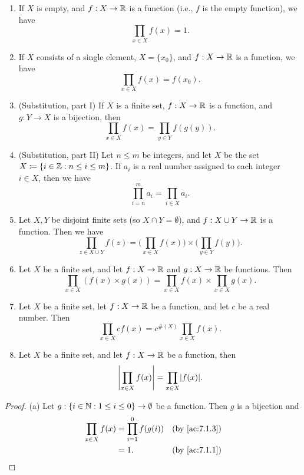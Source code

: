 \begin{ac}\label{ac:7.1.5}
  \mbox{}
  \begin{enumerate}
    \item If \(X\) is empty, and \(f : X \to \mathbb{R}\) is a function (i.e., \(f\) is the empty function), we have
          \[
            \prod_{x \in X} f(x) = 1.
          \]
    \item If \(X\) consists of a single element, \(X = \{x_0\}\), and \(f : X \to \mathbb{R}\) is a function, we have
          \[
            \prod_{x \in X} f(x) = f(x_0).
          \]
    \item (Substitution, part I) If \(X\) is a finite set, \(f : X \to \mathbb{R}\) is a function, and \(g : Y \to X\) is a bijection, then
          \[
            \prod_{x \in X} f(x) = \prod_{y \in Y} f(g(y)).
          \]
    \item (Substitution, part II) Let \(n \leq m\) be integers, and let \(X\) be the set \(X \coloneqq \{i \in \mathbb{Z} : n \leq i \leq m\}\).
          If \(a_i\) is a real number assigned to each integer \(i \in X\), then we have
          \[
            \prod_{i = n}^m a_i = \prod_{i \in X} a_i.
          \]
    \item Let \(X, Y\) be disjoint finite sets (so \(X \cap Y = \emptyset\)), and \(f : X \cup Y \to \mathbb{R}\) is a function.
          Then we have
          \[
            \prod_{z \in X \cup Y} f(z) = \Bigg(\prod_{x \in X} f(x)\Bigg) \times \Bigg(\prod_{y \in Y} f(y)\Bigg).
          \]
    \item Let \(X\) be a finite set, and let \(f : X \to \mathbb{R}\) and \(g : X \to \mathbb{R}\) be functions.
          Then
          \[
            \prod_{x \in X} (f(x) \times g(x)) = \prod_{x \in X} f(x) \times \prod_{x \in X} g(x).
          \]
    \item Let \(X\) be a finite set, let \(f : X \to \mathbb{R}\) be a function, and let \(c\) be a real number.
          Then
          \[
            \prod_{x \in X} cf(x) = c^{\#(X)} \prod_{x \in X} f(x).
          \]
    \item Let \(X\) be a finite set, and let \(f : X \to \mathbb{R}\) be a function, then
          \[
            \abs{\prod_{x \in X} f(x)} = \prod_{x \in X} \abs{f(x)}.
          \]
  \end{enumerate}
\end{ac}

\begin{proof}{(a)}
  Let \(g : \{i \in \mathbb{N} : 1 \leq i \leq 0\} \to \emptyset\) be a function.
  Then \(g\) is a bijection and
  \begin{align*}
    \prod_{x \in X} f(x) & = \prod_{i = 1}^0 f(g(i)) & \text{(by \cref{ac:7.1.3})} \\
                         & = 1.                      & \text{(by \cref{ac:7.1.1})}
  \end{align*}
\end{proof}

